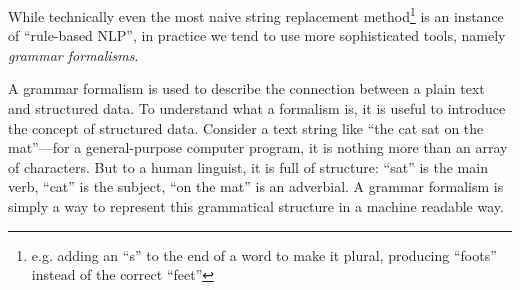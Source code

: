 
While technically even the most naive string replacement method\footnote{e.g. adding an ``s'' to the end of a word to make it plural, producing ``foots'' instead of the correct ``feet''} is an instance of ``rule-based \ac{NLP}'', in practice we tend to use more sophisticated tools, namely \emph{grammar formalisms}.

%
%
%
%
%

A grammar formalism is used to describe the connection between a plain text and structured data. To understand what a formalism is, it is useful to introduce the concept of structured data. Consider a text string like ``the cat sat on the mat''—for a general-purpose computer program, it is nothing more than an array of characters. But to a human linguist, it is full of structure: ``sat'' is the main verb, ``cat'' is the subject, “on the mat” is an adverbial. A grammar formalism is simply a way to represent this grammatical structure in a machine readable way.



